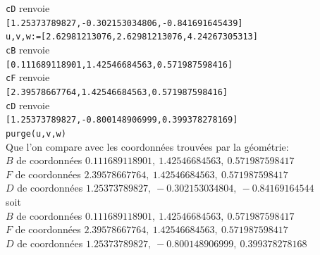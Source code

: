 \documentclass[a4paper,11pt]{book}
\begin{document}
\begin{itemize}
{\tt cD} renvoie \\
{\tt [1.25373789827,-0.302153034806,-0.841691645439]}\\
{\tt u,v,w:=[2.62981213076,2.62981213076,4.24267305313]}\\
{\tt cB} renvoie \\
{\tt [0.111689118901,1.42546684563,0.571987598416]}\\
{\tt cF} renvoie \\
{\tt [2.39578667764,1.42546684563,0.571987598416]}\\
{\tt cD} renvoie \\
{\tt [1.25373789827,-0.800148906999,0.399378278169]}\\
{\tt purge(u,v,w)}\\
Que l'on compare avec les coordonn\'ees trouv\'ees par la g\'eom\'etrie:\\
$B$ de coordonn\'ees $0.111689118901,\ 1.42546684563,\ 0.571987598417$\\
$F$ de coordonn\'ees $2.39578667764,\ 1.42546684563,\ 0.571987598417$\\
$D$ de coordonn\'ees $1.25373789827,\ -0.302153034804,\ -0.84169164544$\\
soit \\
$B$ de coordonn\'ees $0.111689118901,\ 1.42546684563,\ 0.571987598417$\\
$F$ de coordonn\'ees $2.39578667764,\ 1.42546684563,\ 0.571987598417$\\
$D$ de coordonn\'ees $1.25373789827,\ -0.800148906999,\ 0.399378278168$


\end{itemize}
\end{document}
